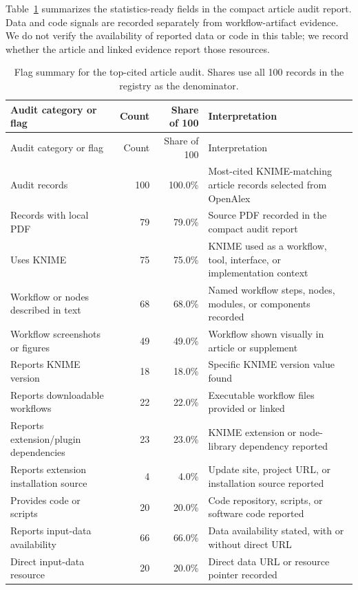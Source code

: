 \documentclass[runningheads]{llncs}
\begin{document}
Table~\ref{tab:top-cited-assessment} summarizes the statistics-ready fields in
the compact article audit report. Data and code signals are recorded separately
from workflow-artifact evidence. We do not verify the availability of reported
data or code in this table; we record whether the article and linked evidence
report those resources.

\begingroup
\scriptsize
\renewcommand{\arraystretch}{1.18}
\begin{longtable}{|%
  >{\raggedright\arraybackslash}p{}|
  r|
  r|
  >{\raggedright\arraybackslash}p{}|}
\caption{Flag summary for the top-cited article audit. Shares use all
100 records in the registry as the denominator.}
\label{tab:top-cited-assessment}\\
\toprule
Audit category or flag & Count & Share of 100 & Interpretation \\
\midrule
\endfirsthead
\toprule
Audit category or flag & Count & Share of 100 & Interpretation \\
\midrule
\endhead
\bottomrule
\endfoot
Audit records & 100 & 100.0\% & Most-cited KNIME-matching article records selected from OpenAlex \\
Records with local PDF & 79 & 79.0\% & Source PDF recorded in the compact audit report \\
\midrule
Uses KNIME & 75 & 75.0\% & KNIME used as a workflow, tool, interface, or implementation context \\
Workflow or nodes described in text & 68 & 68.0\% & Named workflow steps, nodes, modules, or components recorded \\
Workflow screenshots or figures & 49 & 49.0\% & Workflow shown visually in article or supplement \\
Reports KNIME version & 18 & 18.0\% & Specific KNIME version value found \\
Reports downloadable workflows & 22 & 22.0\% & Executable workflow files provided or linked \\
Reports extension/plugin dependencies & 23 & 23.0\% & KNIME extension or node-library dependency reported \\
Reports extension installation source & 4 & 4.0\% & Update site, project URL, or installation source reported \\
\midrule
Provides code or scripts & 20 & 20.0\% & Code repository, scripts, or software code reported \\
Reports input-data availability & 66 & 66.0\% & Data availability stated, with or without direct URL \\
Direct input-data resource & 20 & 20.0\% & Direct data URL or resource pointer recorded \\
\end{longtable}
\endgroup
\end{document}
